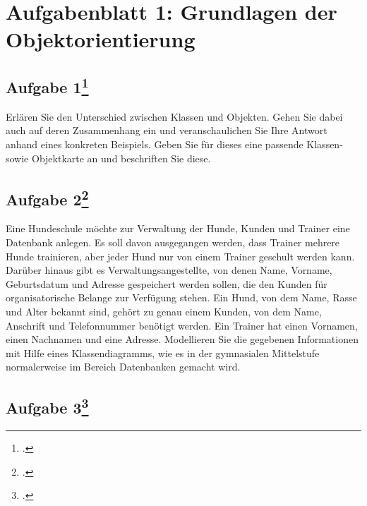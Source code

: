 \documentclass{lehramt-informatik}
\begin{document}
\chapter{Aufgabenblatt 1: Grundlagen der Objektorientierung}

%

\section{Aufgabe 1\footcite{oomup:ab:1}}

Erlären Sie den Unterschied zwischen Klassen und Objekten. Gehen Sie
dabei auch auf deren Zusammenhang ein und veranschaulichen Sie Ihre
Antwort anhand eines konkreten Beispiels. Geben Sie für dieses eine
passende Klassen- sowie Objektkarte an und beschriften Sie diese.

%

\section{Aufgabe 2\footcite{oomup:ab:1}}

Eine Hundeschule möchte zur Verwaltung der Hunde, Kunden und Trainer
eine Datenbank anlegen. Es soll davon ausgegangen werden, dass Trainer
mehrere Hunde trainieren, aber jeder Hund nur von einem Trainer geschult
werden kann. Darüber hinaus gibt es Verwaltungsangestellte, von denen
Name, Vorname, Geburtsdatum und Adresse gespeichert werden sollen, die
den Kunden für organisatorische Belange zur Verfügung stehen. Ein Hund,
von dem Name, Rasse und Alter bekannt sind, gehört zu genau einem
Kunden, von dem Name, Anschrift und Telefonnummer benötigt werden. Ein
Trainer hat einen Vornamen, einen Nachnamen und eine Adresse.
Modellieren Sie die gegebenen Informationen mit Hilfe eines
Klassendiagramms, wie es in der gymnasialen Mittelstufe normalerweise im
Bereich Datenbanken gemacht wird.

%

\section{Aufgabe 3\footcite{oomup:ab:1}}
\end{document}
